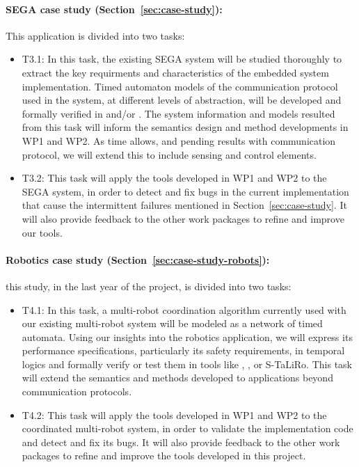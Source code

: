 \paragraph{SEGA case study (Section~\ref{sec:case-study}):} This application is divided into two tasks:
\noindent  \begin{itemize}[labelsep=3pt,leftmargin=12pt]
  \item T3.1: In this task, the existing SEGA system will be
    studied thoroughly to extract the key requirments and
    characteristics of the embedded system implementation.  Timed
    automaton models of the communication protocol used in the system,
    at different levels of abstraction, will be developed and formally
    verified in \uppaal and/or \prism. The system information and models
    resulted from this task will inform the semantics design and method
    developments in WP1 and WP2. As time allows, and pending results
    with communication protocol, we will extend this to include sensing
    and control elements.
  \item T3.2: This task will apply the tools developed in WP1 and WP2
    to the SEGA system, in order to detect and fix bugs in the current
    implementation that cause the intermittent failures mentioned in
    Section~\ref{sec:case-study}.  It will also provide feedback to
    the other work packages to refine and improve our tools.
  \end{itemize}

\paragraph {Robotics case study (Section~\ref{sec:case-study-robots}):} this study, in the last year of the project, is divided into two tasks:
\noindent \begin{itemize}[labelsep=3pt,leftmargin=12pt]
  \item T4.1: In this task, a multi-robot coordination algorithm
    currently used with our existing multi-robot system will be
    modeled as a network of timed automata.  Using our insights into
    the robotics application, we will express its performance
    specifications, particularly its safety requirements, in temporal
    logics and formally verify or test them in tools like \uppaal,
    \prism, or S-TaLiRo.  This task will extend the semantics and
    methods developed to applications beyond communication protocols.
  \item T4.2: This task will apply the tools developed in WP1 and WP2 to the coordinated multi-robot system, in order to validate the implementation code and detect and fix its bugs.  It will also provide feedback to the other work packages to refine and improve the tools developed in this project.
  \end{itemize}


